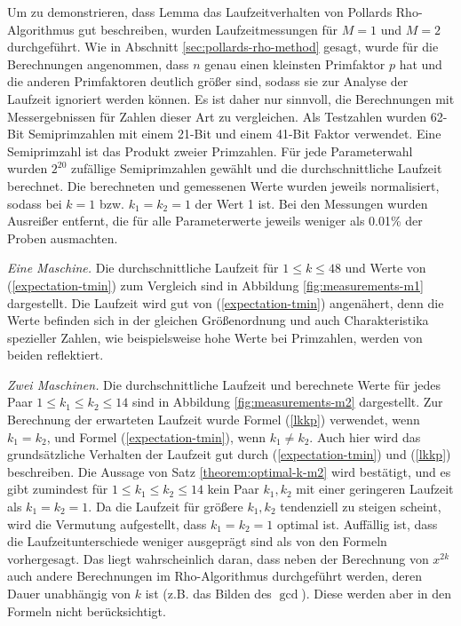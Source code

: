 \documentclass[a4paper, 11pt, ngerman]{article}
\theoremstyle{definition}
\theoremstyle{plain}
\theoremstyle{remark}
\begin{document}
Um zu demonstrieren, dass Lemma das Laufzeitverhalten von Pollards Rho-Algorithmus gut beschreiben, wurden Laufzeitmessungen für $M = 1$ und $M = 2$ durchgeführt. Wie in Abschnitt \ref{sec:pollards-rho-method} gesagt, wurde für die Berechnungen angenommen, dass $n$ genau einen kleinsten Primfaktor $p$ hat und die anderen Primfaktoren deutlich größer sind, sodass sie zur Analyse der Laufzeit ignoriert werden können. Es ist daher nur sinnvoll, die Berechnungen mit Messergebnissen für Zahlen dieser Art zu vergleichen. Als Testzahlen wurden 62-Bit Semiprimzahlen mit einem 21-Bit und einem 41-Bit Faktor verwendet. Eine Semiprimzahl ist das Produkt zweier Primzahlen. Für jede Parameterwahl wurden $2^{20}$ zufällige Semiprimzahlen gewählt und die durchschnittliche Laufzeit berechnet. Die berechneten und gemessenen Werte wurden jeweils normalisiert, sodass bei $k = 1$ bzw. $k_1 = k_2 = 1$ der Wert 1 ist. Bei den Messungen wurden Ausreißer entfernt, die für alle Parameterwerte jeweils weniger als 0.01\% der Proben ausmachten.

\emph{Eine Maschine.} Die durchschnittliche Laufzeit für $1 \le k \le 48$ und Werte von (\ref{expectation-tmin}) zum Vergleich sind in Abbildung \ref{fig:measurements-m1} dargestellt. Die Laufzeit wird gut von (\ref{expectation-tmin}) angenähert, denn die Werte befinden sich in der gleichen Größenordnung und auch Charakteristika spezieller Zahlen, wie beispielsweise hohe Werte bei Primzahlen, werden von beiden reflektiert.

\emph{Zwei Maschinen.} Die durchschnittliche Laufzeit und berechnete Werte für jedes Paar $1 \le k_1 \le k_2 \le 14$ sind in Abbildung \ref{fig:measurements-m2} dargestellt. Zur Berechnung der erwarteten Laufzeit wurde Formel (\ref{lkkp}) verwendet, wenn $k_1 = k_2$, und Formel (\ref{expectation-tmin}), wenn $k_1 \ne k_2$. Auch hier wird das grundsätzliche Verhalten der Laufzeit gut durch (\ref{expectation-tmin}) und (\ref{lkkp}) beschreiben. Die Aussage von Satz \ref{theorem:optimal-k-m2} wird bestätigt, und es gibt zumindest für $1 \le k_1 \le k_2 \le 14$ kein Paar $k_1, k_2$ mit einer geringeren Laufzeit als $k_1 = k_2 = 1$. Da die Laufzeit für größere $k_1, k_2$ tendenziell zu steigen scheint, wird die Vermutung aufgestellt, dass $k_1 = k_2 = 1$ optimal ist. Auffällig ist, dass die Laufzeitunterschiede weniger ausgeprägt sind als von den Formeln vorhergesagt. Das liegt wahrscheinlich daran, dass neben der Berechnung von $x^{2k}$ auch andere Berechnungen im Rho-Algorithmus durchgeführt werden, deren Dauer unabhängig von $k$ ist (z.B. das Bilden des $\gcd$). Diese werden aber in den Formeln nicht berücksichtigt.
\end{document}
